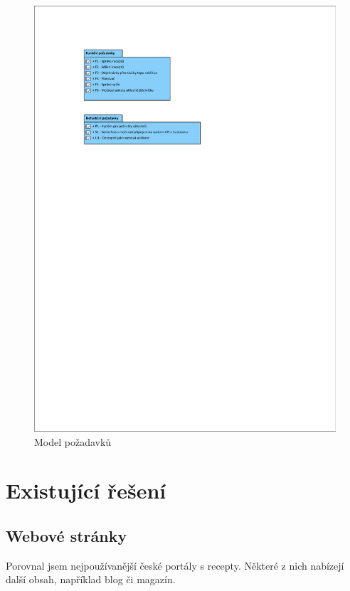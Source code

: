 \begin{figure}[H]
    \includegraphics[width=\textwidth]{pdf/requirements}
    \caption{Model požadavků} \label{picture:recipeo:pozadavky}
\end{figure}

\newpage

\section{Existující řešení}

\subsection{Webové stránky}

Porovnal jsem nejpoužívanější české portály s recepty. Některé z nich nabízejí další obsah, například blog či magazín.

